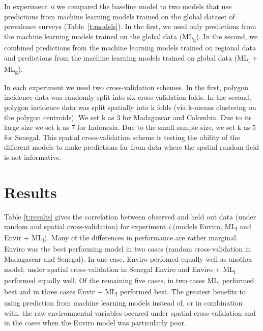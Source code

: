 \documentclass[review]{elsarticle}
\begin{document}
In experiment \emph{ii} we compared the baseline model to two models that use predictions from machine learning models trained on the global dataset of prevalence surveys (Table~\ref{t:models}).
In the first, we used only predictions from the machine learning models trained on the global data (ML\textsubscript{g}).
In the second, we combined predictions from the machine learning models trained on regional data and predictions from the machine learning models trained on global data (ML\textsubscript{l} + ML\textsubscript{g}).


In each experiment we used two cross-validation schemes. 
In the first, polygon incidence data was randomly split into six cross-validation folds.
In the second, polygon incidence data was split spatially into k folds (via k-means clustering on the polygon centroids).
We set k as 3 for Madagascar and Colombia.
Due to its large size we set k as 7 for Indonesia.
Due to the small sample size, we set k as 5 for Senegal.
This spatial cross-validation scheme is testing the ability of the different models to make predictions far from data where the spatial random field is not informative.



\section{Results}



Table \ref{t:results} gives the correlation between observed and held out data (under random and spatial cross-validation) for experiment \emph{i} (models Enviro, ML\textsubscript{l} and Envir + ML\textsubscript{l}).
Many of the differences in performance are rather marginal.
Enviro was the best performing model in two cases (random cross-validation in Madagascar and Senegal).
In one case, Enviro perfomed equally well as another model; under spatial cross-validation in Senegal Enviro and Enviro + ML\textsubscript{l} performed equally well.
Of the remaining five cases, in two cases ML\textsubscript{l} performed best and in three cases Envir + ML\textsubscript{l} performed best.
The greatest benefits to using prediction from machine learning models instead of, or in combination with, the raw environmental variables occured under spatial cross-validation and in the cases when the Enviro model was particularly poor.
\end{document}

